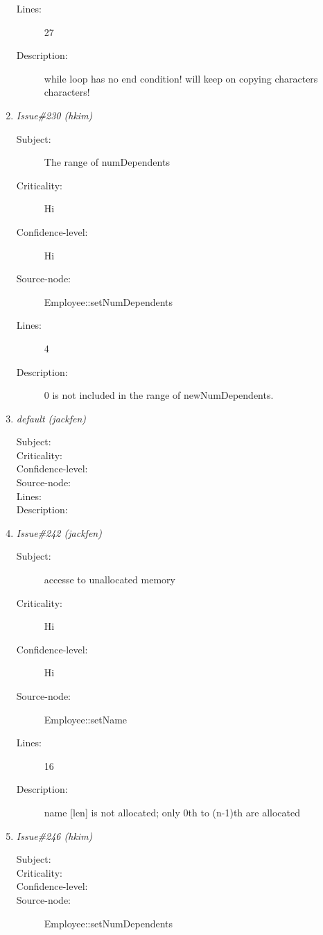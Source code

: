 \begin{enumerate}
\begin{description}
\item [Lines:] 27

\item [Description:] while loop has no end condition! will keep on copying characters characters!
\end{description}
\item {\it Issue\#230 (hkim)}
\begin{description}
\item [Subject:] The range of numDependents
\item [Criticality:] Hi
\item [Confidence-level:] Hi
\item [Source-node:] Employee::setNumDependents

\item [Lines:] 4

\item [Description:] 0 is not included in the range of newNumDependents.
\end{description}
\item {\it default (jackfen)}
\begin{description}
\item [Subject:] 
\item [Criticality:] 
\item [Confidence-level:] 
\item [Source-node:] 

\item [Lines:] 

\item [Description:] 
\end{description}
\item {\it Issue\#242 (jackfen)}
\begin{description}
\item [Subject:] accesse to unallocated memory
\item [Criticality:] Hi
\item [Confidence-level:] Hi
\item [Source-node:] Employee::setName

\item [Lines:] 16

\item [Description:] name [len] is not allocated; only 0th to
(n-1)th are allocated
\end{description}
\item {\it Issue\#246 (hkim)}
\begin{description}
\item [Subject:] 
\item [Criticality:] 
\item [Confidence-level:] 
\item [Source-node:] Employee::setNumDependents


\end{description}
\end{enumerate}
